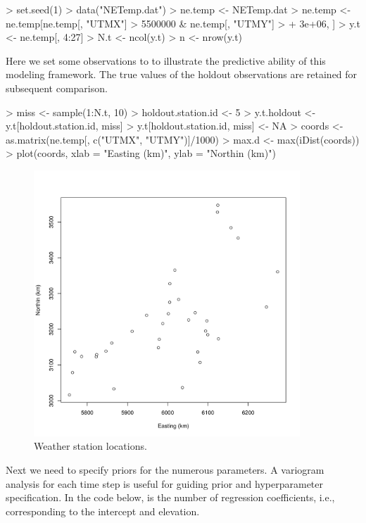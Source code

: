 \documentclass{article}
\begin{document}
\begin{Schunk}
\begin{Sinput}
> set.seed(1)
> data("NETemp.dat")
> ne.temp <- NETemp.dat
> ne.temp <- ne.temp[ne.temp[, "UTMX"] > 5500000 & ne.temp[, "UTMY"] > 
+     3e+06, ]
> y.t <- ne.temp[, 4:27]
> N.t <- ncol(y.t)
> n <- nrow(y.t)
\end{Sinput}
\end{Schunk}

Here we set some observations to \verb@NA@ to illustrate the predictive ability of this modeling framework. The true values of the holdout observations are retained for subsequent comparison.

\begin{Schunk}
\begin{Sinput}
> miss <- sample(1:N.t, 10)
> holdout.station.id <- 5
> y.t.holdout <- y.t[holdout.station.id, miss]
> y.t[holdout.station.id, miss] <- NA
> coords <- as.matrix(ne.temp[, c("UTMX", "UTMY")]/1000)
> max.d <- max(iDist(coords))
> plot(coords, xlab = "Easting (km)", ylab = "Northin (km)")
\end{Sinput}
\end{Schunk}
\clearpage
\begin{figure}
\begin{center}
\includegraphics[width=10cm]{figures/fig-data}
\end{center}
\caption{Weather station locations.}
\label{fig:fig-data}
\end{figure}

Next we need to specify priors for the numerous parameters. A variogram analysis for each time step is useful for guiding prior and hyperparameter specification. In the code below, \verb@p@ is the number of regression coefficients, i.e., corresponding to the intercept and elevation.
\end{document}
